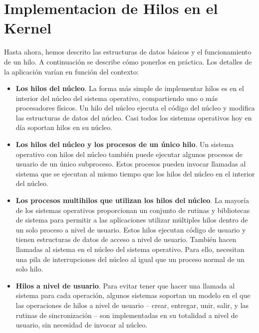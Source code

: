 \documentclass[10pt]{book}
\begin{document}
\section{Implementacion de Hilos en el Kernel}
Hasta ahora, hemos descrito las estructuras de datos básicos y el funcionamiento de un hilo. A continuación se describe cómo ponerlos en práctica. Los detalles de la aplicación varían en función del contexto:
\begin{itemize}
\item \textbf{Los hilos del núcleo}. La forma más simple de implementar hilos es en el interior del núcleo del sistema operativo, compartiendo uno o más procesadores físicos. Un hilo del núcleo ejecuta el código del núcleo y modifica las estructuras de datos del núcleo. Casi todos los sistemas operativos hoy en día soportan hilos en su núcleo.

\item \textbf{Los hilos del núcleo y los procesos de un único hilo}. Un sistema operativo con hilos del núcleo también puede ejecutar algunos procesos de usuario de un único subproceso. Estos procesos pueden invocar llamadas al sistema que se ejecutan al mismo tiempo que los hilos del núcleo en el interior del núcleo.

\item \textbf{Los procesos multihilos que utilizan los hilos del núcleo}. La mayoría de los sistemas operativos proporcionan un conjunto de rutinas y bibliotecas de sistema para permitir a las aplicaciones utilizar múltiples hilos dentro de un solo proceso a nivel de usuario. Estos hilos ejecutan código de usuario y tienen estructuras de datos de acceso a nivel de usuario. También hacen llamadas al sistema en el núcleo del sistema operativo. Para ello, necesitan una pila de interrupciones del núcleo al igual que un proceso normal de un solo hilo.

\item \textbf{Hilos a nivel de usuario}. Para evitar tener que hacer una llamada al sistema para cada operación, algunos sistemas soportan un modelo en el que las operaciones de hilos a nivel de usuario -- crear, entregar, unir, salir, y las rutinas de sincronización -- son implementadas en su totalidad a nivel de usuario, sin necesidad de invocar al núcleo.
\end{itemize}
\end{document}
